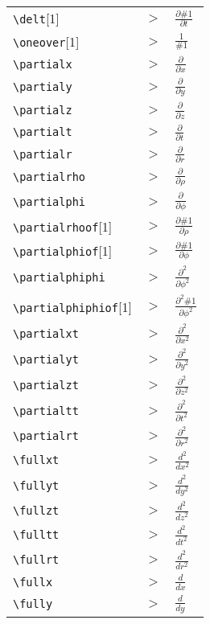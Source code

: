 \begin{tabular}{l l l}

\verb|\delt|[1] &$\gt$& ${\frac{\partial \#1}{\partial t}}$\\[5pt] 
\verb|\oneover|[1] &$\gt$& ${\frac{1}{\#1}}$\\[5pt] 
\verb|\partialx| &$\gt$& ${\frac{\partial }{\partial x}}$\\[5pt] 
\verb|\partialy| &$\gt$& ${\frac{\partial }{\partial y}}$\\[5pt] 
\verb|\partialz| &$\gt$& ${\frac{\partial }{\partial z}}$\\[5pt] 
\verb|\partialt| &$\gt$& ${\frac{\partial }{\partial t}}$\\[5pt] 
\verb|\partialr| &$\gt$& ${\frac{\partial }{\partial r}}$\\[5pt] 
\verb|\partialrho| &$\gt$& ${\frac{\partial}{\partial \rho}}$\\[5pt] 
\verb|\partialphi| &$\gt$& ${\frac{\partial}{\partial \phi}}$\\[5pt] 
\verb|\partialrhoof|[1] &$\gt$& ${\frac{\partial \#1}{\partial \rho}}$\\[5pt] 
\verb|\partialphiof|[1] &$\gt$& ${\frac{\partial \#1}{\partial \phi}}$\\[5pt] 
\verb|\partialphiphi| &$\gt$& ${\frac{\partial^2 }{ \partial \phi^2}}$\\[5pt] 
\verb|\partialphiphiof|[1] &$\gt$& ${\frac{\partial^2 \#1}{\partial \phi^2}}$\\[5pt] 
\verb|\partialxt| &$\gt$& ${\frac{\partial^2 }{\partial x^2}}$\\[5pt] 
\verb|\partialyt| &$\gt$& ${\frac{\partial^2 }{\partial y^2}}$\\[5pt] 
\verb|\partialzt| &$\gt$& ${\frac{\partial^2 }{\partial z^2}}$\\[5pt] 
\verb|\partialtt| &$\gt$& ${\frac{\partial^2 }{\partial t^2}}$\\[5pt] 
\verb|\partialrt| &$\gt$& ${\frac{\partial^2 }{\partial r^2}}$\\[5pt] 
\verb|\fullxt| &$\gt$& ${\frac{d^2 }{d x^2}}$\\[5pt] 
\verb|\fullyt| &$\gt$& ${\frac{d^2 }{d y^2}}$\\[5pt] 
\verb|\fullzt| &$\gt$& ${\frac{d^2 }{d z^2}}$\\[5pt] 
\verb|\fulltt| &$\gt$& ${\frac{d^2 }{d t^2}}$\\[5pt] 
\verb|\fullrt| &$\gt$& ${\frac{d^2 }{d r^2}}$\\[5pt] 
\verb|\fullx| &$\gt$& ${\frac{d }{d x}}$\\[5pt] 
\verb|\fully| &$\gt$& ${\frac{d }{d y}}$\\[5pt] 
\end{tabular}

